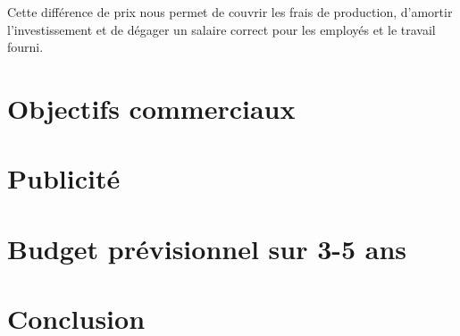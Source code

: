 \documentclass{article}
\begin{document}
Cette différence de prix nous permet de couvrir les frais de production, d'amortir l'investissement et de dégager un salaire correct pour les employés et le travail fourni.

\section{Objectifs commerciaux}

\section{Publicité}

\section{Budget prévisionnel sur 3-5 ans}

\section{Conclusion}



\end{document}

